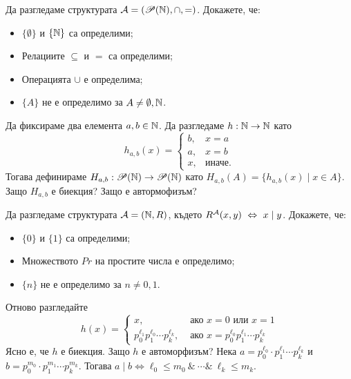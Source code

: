 \begin{problem}
  Да разгледаме структурата $\mathcal{A} = (\mathscr{P}(\mathbb{N}), \cap, =)$.  Докажете, че:
  \begin{itemize}
  \item
    $\{\emptyset\}$ и $\{\mathbb{N}\}$ са определими;
  \item
    Релациите $\subseteq$ и $=$ са определими;
  \item
    Операцията $\cup$ е определима;
  \item
    $\{A\}$ не е определимо за $A \neq \emptyset, \mathbb{N}$.
  \end{itemize}
\end{problem}
\begin{hint}
  Да фиксираме два елемента $a,b\in\mathbb{N}$.
  Да разгледаме $h:\mathbb{N} \to \mathbb{N}$ като
  \[h_{a,b}(x) =
    \begin{cases}
      b, & x = a\\
      a, & x = b\\
      x, & \text{иначе}.
    \end{cases}\]
  Тогава дефинираме $H_{a,b}:\mathscr{P}(\mathbb{N}) \to \mathscr{P}(\mathbb{N})$ като
  $H_{a,b}(A) = \{h_{a,b}(x) \mid x \in A\}$.
  Защо $H_{a,b}$ е биекция? Защо е автормофизъм?
\end{hint}

\begin{problem}
  Да разгледаме структурата $\mathcal{A} = (\mathbb{N}, R)$, където $R^{\mathcal{A}}(x,y) \ \Leftrightarrow\  x \mid y$.
  Докажете, че:
  \begin{itemize}
  \item
    $\{0\}$ и $\{1\}$ са определими;
  \item
    Множеството $Pr$ на простите числа е определимо;
  \item
    $\{n\}$ не е определимо за $n \neq 0,1$.
  \end{itemize}
\end{problem}
\begin{hint}
  Отново разгледайте
  \[h(x) =
    \begin{cases}
      x, & \text{ ако }x = 0 \text{ или } x = 1\\
      p^{\ell_1}_0p^{\ell_0}_1\cdots p^{\ell_k}_k, & \text{ ако }x = p^{\ell_0}_0 p^{\ell_1}_1 \cdots p^{\ell_k}_k
    \end{cases}\]
  Ясно е, че $h$ е биекция. Защо $h$ е автоморфизъм?
  Нека $a = p^{\ell_0}_0 \cdot p^{\ell_1}_1 \cdots p^{\ell_k}_k$ и $b = p^{m_0}_0 \cdot p^{m_1}_1 \cdots p^{m_k}_k$. Тогава
  $a \mid b \iff \ell_0 \leq m_0\ \&\ \cdots \&\ \ell_k \leq m_k$.
\end{hint}

